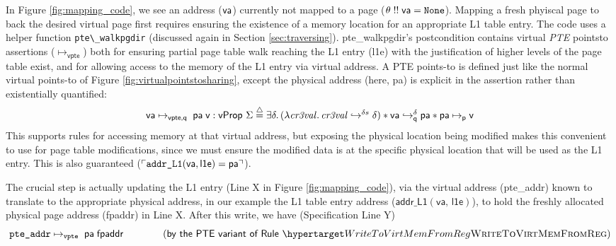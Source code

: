 In Figure \ref{fig:mapping_code}, we see an address ($\vaddr$) currently not
mapped to a page ($\theta \; !!\; \vaddr = \texttt{None}$). Mapping a fresh
phyiscal page to back the desired virtual page first requires ensuring
the existence of a memory location for an appropriate L1 table entry.
The code uses a helper function \lstinline{pte\_walkpgdir} (discussed again in Section \ref{sec:traversing}).
\textsf{pte\_walkpgdir}'s postcondition contains virtual \emph{PTE} pointsto assertions ($\mapsto_{\textsf{vpte}}$)   both for ensuring partial page table walk reaching the
L1 entry (l1e) with the justification of higher levels of the page table exist, and for allowing access to the memory of the L1 entry via virtual address.
A PTE points-to is defined just like the normal virtual points-to of Figure \ref{fig:virtualpointstosharing}, except the physical address (here, \textsf{pa}) is explicit in the assertion 
rather than existentially quantified:
 \[
\begin{array}{l}
    \vaddr\mapsto_{\textsf{vpte,q}} \; \paddr \; \vpage : \mathsf{vProp}~\Sigma \stackrel{\triangle}{=} 
    \exists \delta\ldotp
	(\lambda \mathit{cr3val}\ldotp
	\ghostmaptoken{\delta{}s}{\mathit{cr3val}}{\delta}) \ast 
  \fracghostmaptoken{\delta}{\vaddr}{\paddr}{\qfrac} \ast \paddr \mapsto_{\mathsf{p}} \vpage
\end{array}
\]
This supports rules for accessing memory
at that virtual address, but exposing the physical location being modified
makes this convenient to use for page table modifications, since we must ensure
the modified data is at the specific physical location that will be used as the L1 entry.
This is also guaranteed ($ \ulcorner
\texttt{addr\_L1}(\vaddr,\entryo) = \paddr\urcorner$).


The crucial step is actually updating the L1 entry (Line X in Figure \ref{fig:mapping_code}),
via the virtual address
(\textsf{pte\_addr}) known to translate to the appropriate physical address, in our example the L1
table entry address ($\textsf{addr\_L1}(\textsf{va, l1e})$), to hold the freshly
allocated physical page address (\textsf{fpaddr}) in Line X.
After this write, we have (Specification Line Y)
\[\texttt{pte\_addr} \mapsto_{\texttt{vpte}}  \; \paddr\; \textsf{fpaddr}  \qquad\qquad (\textsf{by the PTE variant of Rule}~\TirNameStyle{WriteToVirtMemFromReg})\]

